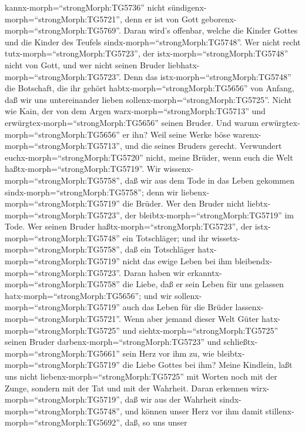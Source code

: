 kannx-morph=``strongMorph:TG5736'' nicht
sündigenx-morph=``strongMorph:TG5721'', denn er ist von Gott
geborenx-morph=``strongMorph:TG5769''.  Daran wird's
offenbar, welche die Kinder Gottes und die Kinder des Teufels
sindx-morph=``strongMorph:TG5748''. Wer nicht recht
tutx-morph=``strongMorph:TG5723'', der istx-morph=``strongMorph:TG5748''
nicht von Gott, und wer nicht seinen Bruder
liebhatx-morph=``strongMorph:TG5723''.  Denn das
istx-morph=``strongMorph:TG5748'' die Botschaft, die ihr gehört
habtx-morph=``strongMorph:TG5656'' von Anfang, daß wir uns untereinander
lieben sollenx-morph=``strongMorph:TG5725''.  Nicht wie
Kain, der von dem Argen warx-morph=``strongMorph:TG5713'' und
erwürgtex-morph=``strongMorph:TG5656'' seinen Bruder. Und warum
erwürgtex-morph=``strongMorph:TG5656'' er ihn? Weil seine Werke böse
warenx-morph=``strongMorph:TG5713'', und die seines Bruders gerecht.
 Verwundert euchx-morph=``strongMorph:TG5720'' nicht, meine
Brüder, wenn euch die Welt haßtx-morph=``strongMorph:TG5719''.
 Wir wissenx-morph=``strongMorph:TG5758'', daß wir aus dem
Tode in das Leben gekommen sindx-morph=``strongMorph:TG5758''; denn wir
liebenx-morph=``strongMorph:TG5719'' die Brüder. Wer den Bruder nicht
liebtx-morph=``strongMorph:TG5723'', der
bleibtx-morph=``strongMorph:TG5719'' im Tode.  Wer seinen
Bruder haßtx-morph=``strongMorph:TG5723'', der
istx-morph=``strongMorph:TG5748'' ein Totschläger; und ihr
wissetx-morph=``strongMorph:TG5758'', daß ein Totschläger
hatx-morph=``strongMorph:TG5719'' nicht das ewige Leben bei ihm
bleibendx-morph=``strongMorph:TG5723''.  Daran haben wir
erkanntx-morph=``strongMorph:TG5758'' die Liebe, daß er sein Leben für
uns gelassen hatx-morph=``strongMorph:TG5656''; und wir
sollenx-morph=``strongMorph:TG5719'' auch das Leben für die Brüder
lassenx-morph=``strongMorph:TG5721''.  Wenn aber jemand
dieser Welt Güter hatx-morph=``strongMorph:TG5725'' und
siehtx-morph=``strongMorph:TG5725'' seinen Bruder
darbenx-morph=``strongMorph:TG5723'' und
schließtx-morph=``strongMorph:TG5661'' sein Herz vor ihm zu, wie
bleibtx-morph=``strongMorph:TG5719'' die Liebe Gottes bei ihm?
 Meine Kindlein, laßt uns nicht
liebenx-morph=``strongMorph:TG5725'' mit Worten noch mit der Zunge,
sondern mit der Tat und mit der Wahrheit.  Daran erkennen
wirx-morph=``strongMorph:TG5719'', daß wir aus der Wahrheit
sindx-morph=``strongMorph:TG5748'', und können unser Herz vor ihm damit
stillenx-morph=``strongMorph:TG5692'',  daß, so uns unser
